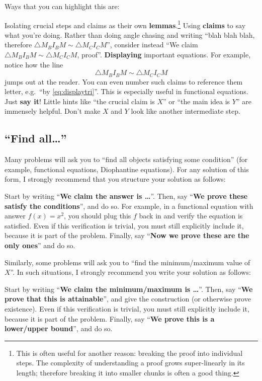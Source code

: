 \documentclass[11pt]{scrartcl}
\begin{document}
Ways that you can highlight this are:
\begin{itemize}
	\ii Isolating crucial steps and claims as their own
	\textbf{lemmas}.\footnote{This is often useful for another reason:
		breaking the proof into individual steps.
		The complexity of understanding a proof grows super-linearly
		in its length; therefore breaking it into smaller chunks
		is often a good thing.}
	\ii Using \textbf{claims} to say what you're doing.
	Rather than doing angle chasing and writing
	``blah blah blah, therefore $\triangle M_B I_B M \sim \triangle M_C I_C M$'',
	consider instead ``We claim $\triangle M_B I_B M \sim \triangle M_C I_C M$, proof''.
	\ii \textbf{Displaying} important equations.
	For example, notice how the line
	\begin{equation}
		\triangle M_B I_B M \sim \triangle M_C I_C M
		\label{eq:displaytri}
	\end{equation}
	jumps out at the reader.
	You can even number such claims to reference them letter,
	e.g.\ ``by \eqref{eq:displaytri}''.
	This is especially useful in functional equations.
	\ii Just \textbf{say it}!
	Little hints like ``the crucial claim is $X$''
	or ``the main idea is $Y$'' are immensely helpful.
	Don't make $X$ and $Y$ look like another intermediate step.
\end{itemize}

\subsection{``Find all\dots''}
Many problems will ask you to ``find all objects satisfying some condition''
(for example, functional equations, Diophantine equations).
For any solution of this form, I strongly recommend that you
structure your solution as follows:
\begin{itemize}
	\ii Start by writing ``\textbf{We claim the answer is \dots}''.
	\ii Then, say ``\textbf{We prove these satisfy the conditions}'', and do so.
	For example, in a functional equation with answer $f(x) = x^2$,
	you should plug this $f$ back in and verify the equation is satisfied.
	Even if this verification is trivial,
	you must still explicitly include it,
	because it is part of the problem.
	\ii Finally, say ``\textbf{Now we prove these are the only ones}''
	and do so.
\end{itemize}

Similarly, some problems will ask you to
``find the minimum/maximum value of $X$''.
In such situations, I strongly recommend you write your solution as follows:
\begin{itemize}
	\ii Start by writing ``\textbf{We claim the minimum/maximum is \dots}''.
	\ii Then, say ``\textbf{We prove that this is attainable}'',
	and give the construction (or otherwise prove existence).
	Even if this verification is trivial,
	you must still explicitly include it,
	because it is part of the problem.
	\ii Finally, say ``\textbf{We prove this is a lower/upper bound}'', and do so.
\end{itemize}
\end{document}
